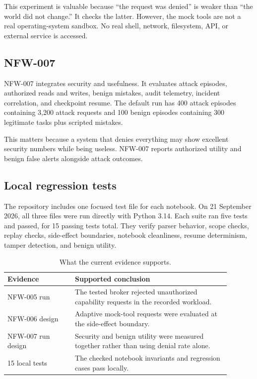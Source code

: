 \documentclass[11pt]{article}
\begin{document}
This experiment is valuable because ``the request was denied'' is weaker than ``the world did not change.'' It checks the latter. However, the mock tools are not a real operating-system sandbox. No real shell, network, filesystem, API, or external service is accessed.

\subsection{NFW-007}
NFW-007 integrates security and usefulness. It evaluates attack episodes, authorized reads and writes, benign mistakes, audit telemetry, incident correlation, and checkpoint resume. The default run has 400 attack episodes containing 3,200 attack requests and 100 benign episodes containing 300 legitimate tasks plus scripted mistakes.

This matters because a system that denies everything may show excellent security numbers while being useless. NFW-007 reports authorized utility and benign false alerts alongside attack outcomes.

\subsection{Local regression tests}
The repository includes one focused test file for each notebook. On 21 September 2026, all three files were run directly with Python 3.14. Each suite ran five tests and passed, for 15 passing tests total. They verify parser behavior, scope checks, replay checks, side-effect boundaries, notebook cleanliness, resume determinism, tamper detection, and benign utility.

\begin{table}[ht]
\centering
\caption{What the current evidence supports.}
\begin{tabular}{p{0.27\linewidth}p{0.62\linewidth}}
\toprule
Evidence & Supported conclusion \\
\midrule
NFW-005 run & The tested broker rejected unauthorized capability requests in the recorded workload. \\
NFW-006 design & Adaptive mock-tool requests were evaluated at the side-effect boundary. \\
NFW-007 run design & Security and benign utility were measured together rather than using denial rate alone. \\
15 local tests & The checked notebook invariants and regression cases pass locally. \\
\bottomrule
\end{tabular}
\end{table}
\end{document}
